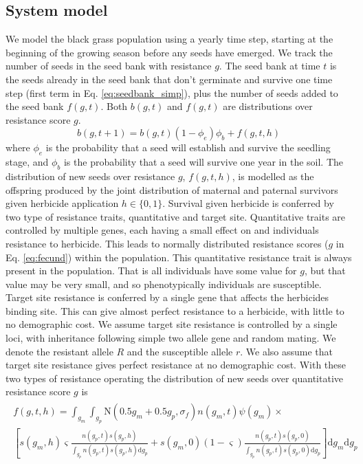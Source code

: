 \documentclass[12pt, a4paper]{article}
\begin{document}
\subsection{System model}
We model the black grass population using a yearly time step, starting at the beginning of the growing season before any seeds have emerged. We track the number of seeds in the seed bank with resistance $g$. The seed bank at time $t$ is the seeds already in the seed bank that don't germinate and survive one time step (first term in Eq. \ref{eq:seedbank_simp}), plus the number of seeds added to the seed bank $f(g, t)$. Both $b(g, t)$ and $f(g, t)$ are distributions over resistance score $g$.     
\begin{equation}\label{eq:seedbank_simp}
	b(g, t + 1) = b(g, t)(1 - \phi_e)\phi_b + f(g, t, h) 
\end{equation}
where $\phi_e$ is the probability that a seed will establish and survive the seedling stage, and $\phi_b$ is the probability that a seed will survive one year in the soil. The distribution of new seeds over resistance $g$, $f(g, t, h)$, is modelled as the offspring produced by the joint distribution of maternal and paternal survivors given herbicide application $h \in \{0, 1\}$. Survival given herbicide is conferred by two type of resistance traits, quantitative and target site. Quantitative traits are controlled by multiple genes, each having a small effect on and individuals resistance to herbicide. This leads to normally distributed resistance scores ($g$ in Eq. \ref{eq:fecund}) within the population. This quantitative resistance trait is always present in the population. That is all individuals have some value for $g$, but that value may be very small, and so phenotypically individuals are susceptible. Target site resistance is conferred by a single gene that affects the herbicides binding site. This can give almost perfect resistance to a herbicide, with little to no demographic cost. We assume target site resistance is controlled by a single loci, with inheritance following simple two allele gene and random mating. We denote the resistant allele $R$ and the susceptible allele $r$. We also assume that target site resistance gives perfect resistance at no demographic cost. With these two types of resistance operating the distribution of new seeds over quantitative resistance score $g$ is      
\begin{align}
\label{eq:fecund}
\begin{split}
	f(g, t, h) =  \displaystyle\int_{g_m}\int_{g_p} \text{N}(0.5 g_m + 0.5 g_p, \sigma_f)n(g_m, t)\psi(g_m)\times\\ 
	\left[s(g_m, h) \varsigma\frac{n(g_p, t)s(g_p, h)}{\int_{g_p} n(g_p, t)s(g_p, h)\text{d}g_p} + s(g_m, 0)(1 - \varsigma)\frac{n(g_p, t)s(g_p, 0)}{\int_{g_p} n(g_p, t)s(g_p,0)\text{d}g_p}\right] \text{d}g_m\text{d}g_p 
\end{split}
\end{align}
\end{document}
